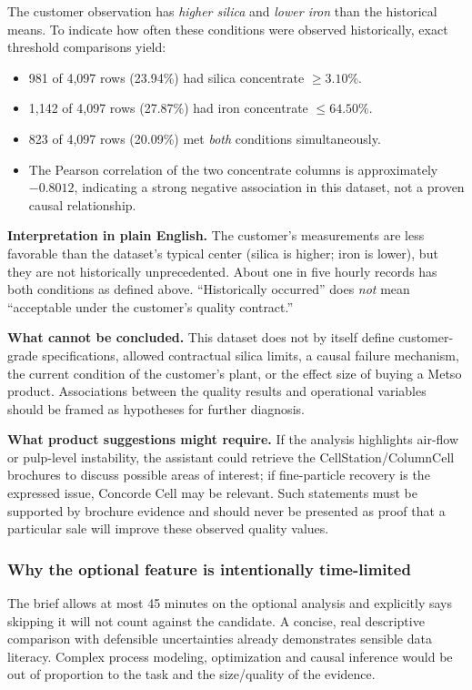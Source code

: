 \documentclass[11pt,a4paper]{article}
\begin{document}
The customer observation has \emph{higher silica} and \emph{lower iron} than the historical means. To indicate how often these conditions were observed historically, exact threshold comparisons yield:
\begin{itemize}
\item 981 of 4,097 rows (23.94\%) had silica concentrate \(\geq 3.10\%\).
\item 1,142 of 4,097 rows (27.87\%) had iron concentrate \(\leq 64.50\%\).
\item 823 of 4,097 rows (20.09\%) met \emph{both} conditions simultaneously.
\item The Pearson correlation of the two concentrate columns is approximately \(-0.8012\), indicating a strong negative association in this dataset, not a proven causal relationship.
\end{itemize}

\begin{keybox}
\textbf{Interpretation in plain English.} The customer's measurements are less favorable than the dataset's typical center (silica is higher; iron is lower), but they are not historically unprecedented. About one in five hourly records has both conditions as defined above. ``Historically occurred'' does \emph{not} mean ``acceptable under the customer's quality contract.''
\end{keybox}

\textbf{What cannot be concluded.} This dataset does not by itself define customer-grade specifications, allowed contractual silica limits, a causal failure mechanism, the current condition of the customer's plant, or the effect size of buying a Metso product. Associations between the quality results and operational variables should be framed as hypotheses for further diagnosis.

\textbf{What product suggestions might require.} If the analysis highlights air-flow or pulp-level instability, the assistant could retrieve the CellStation/ColumnCell brochures to discuss possible areas of interest; if fine-particle recovery is the expressed issue, Concorde Cell may be relevant. Such statements must be supported by brochure evidence and should never be presented as proof that a particular sale will improve these observed quality values.

\subsubsection{Why the optional feature is intentionally time-limited}
The brief allows at most 45 minutes on the optional analysis and explicitly says skipping it will not count against the candidate. A concise, real descriptive comparison with defensible uncertainties already demonstrates sensible data literacy. Complex process modeling, optimization and causal inference would be out of proportion to the task and the size/quality of the evidence.
\end{document}

